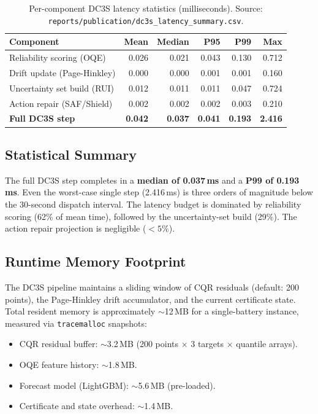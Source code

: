 \begin{table}[ht]
\centering
\caption{Per-component DC3S latency statistics (milliseconds).
  Source: \texttt{reports/publication/dc3s\_latency\_summary.csv}.}
\label{tab:latency}
\begin{tabular}{lrrrrr}
\toprule
\textbf{Component} & \textbf{Mean} & \textbf{Median} &
  \textbf{P95} & \textbf{P99} & \textbf{Max} \\
\midrule
Reliability scoring (OQE)     & 0.026 & 0.021 & 0.043 & 0.130 & 0.712 \\
Drift update (Page-Hinkley)   & 0.000 & 0.000 & 0.001 & 0.001 & 0.160 \\
Uncertainty set build (RUI)   & 0.012 & 0.011 & 0.011 & 0.047 & 0.724 \\
Action repair (SAF/Shield)    & 0.002 & 0.002 & 0.002 & 0.003 & 0.210 \\
\midrule
\textbf{Full DC3S step}       & \textbf{0.042} & \textbf{0.037} &
  \textbf{0.041} & \textbf{0.193} & \textbf{2.416} \\
\bottomrule
\end{tabular}
\end{table}

\subsection{Statistical Summary}

The full DC3S step completes in a \textbf{median of 0.037\,ms} and
a \textbf{P99 of 0.193\,ms}.  Even the worst-case single step
(2.416\,ms) is three orders of magnitude below the 30-second dispatch
interval.  The latency budget is dominated by reliability scoring
(62\% of mean time), followed by the uncertainty-set build (29\%).
The action repair projection is negligible ($<5\%$).

\subsection{Runtime Memory Footprint}

The DC3S pipeline maintains a sliding window of CQR residuals
(default: 200 points), the Page-Hinkley drift accumulator, and the
current certificate state.  Total resident memory is approximately
$\sim$12\,MB for a single-battery instance, measured via
\texttt{tracemalloc} snapshots:

\begin{itemize}
  \item CQR residual buffer: $\sim$3.2\,MB
    (200 points $\times$ 3 targets $\times$ quantile arrays).
  \item OQE feature history: $\sim$1.8\,MB.
  \item Forecast model (LightGBM): $\sim$5.6\,MB (pre-loaded).
  \item Certificate and state overhead: $\sim$1.4\,MB.
\end{itemize}

